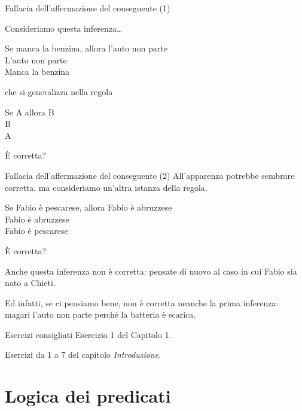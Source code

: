 \documentclass[aspectratio=169,10pt,dvipsnames,handout]{beamer}
\begin{document}
\begin{frame}{Fallacia dell'affermazione del conseguente (1)}

	Consideriamo questa inferenza\ldots
	\begin{center}
		\begin{inference}
			Se manca la benzina, allora l'auto non parte\\
			L'auto non parte\\
			\hline
			Manca la benzina
		\end{inference}
	\end{center}
	che si generalizza nella regola
	\begin{center}
		\begin{inference}
			Se A allora B\\
			B\\
			\hline
			A
		\end{inference}
	\end{center}
	È corretta?
\end{frame}

\begin{frame}{Fallacia dell'affermazione del conseguente (2)}
	All'apparenza potrebbe sembrare corretta, ma consideriamo un'altra istanza della regola.
	\begin{center}
		\begin{inference}
			Se Fabio è pescarese, allora Fabio è abruzzese\\
			Fabio è abruzzese\\
			\hline
			Fabio è pescarese
		\end{inference}
	\end{center}
	È corretta?

	\pause
	\medskip
	Anche questa inferenza \alert{non è corretta}: pensate di nuovo al caso in cui Fabio sia nato a Chieti.

	\medskip
	Ed infatti, se ci pensiamo bene, non è corretta neanche la prima inferenza: magari l'auto non parte perché la batteria è scarica.
\end{frame}

\begin{frame}{Esercizi consigliati}
	Esercizio 1 del Capitolo 1.

	\medskip
	Esercizi da 1 a 7 del capitolo \emph{Introduzione}.
\end{frame}


\section{Logica dei predicati}
\end{document}
